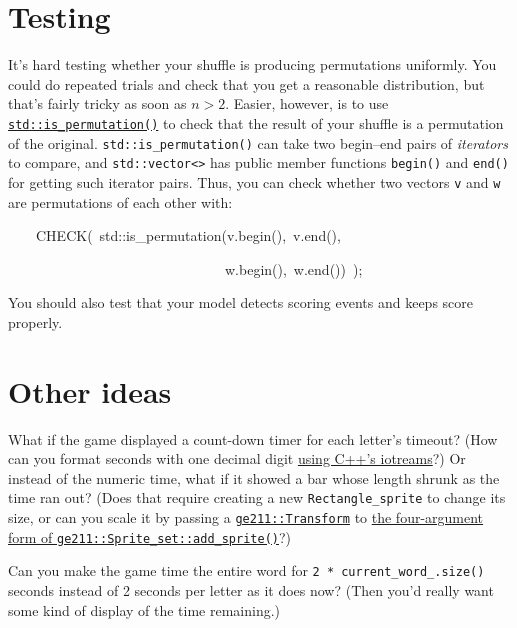 \documentclass{tufte-handout}
\begin{document}
\section{Testing}

It's hard testing whether your shuffle is producing permutations
uniformly. You could do repeated trials and check that you get a
reasonable distribution, but that's fairly tricky as soon as $n > 2$.
Easier, however, is to use
\href{https://en.cppreference.com/w/cpp/algorithm/is_permutation}
{\texttt{std::is_permutation()}} to check that the result of your shuffle
is a permutation of the original. \texttt{std::is_permutation()} can take
two begin--end pairs of \emph{iterators} to compare, and
\verb!std::vector<>! has public member functions \texttt{begin()} and
\texttt{end()} for getting such iterator pairs. Thus, you can check
whether two vectors \texttt{v} and \texttt{w} are permutations of each
other with:

\noindent
\bgroup\ttfamily
\strut~~~~CHECK(~std::is_permutation(v.begin(),~v.end(),
 \\ \noindent
\strut~~~~~~~~~~~~~~~~~~~~~~~~~~~~~~~w.begin(),~w.end())~);
\egroup\par\medskip

You should also test that your model detects scoring events and keeps
score properly.

\section{Other ideas}

What if the game displayed a count-down timer for each letter's timeout?
(How can you format seconds with one decimal digit
\href{https://en.cppreference.com/w/cpp/io/manip/setprecision}{using
C++'s iotreams}?) Or instead of the numeric time, what if it showed a
bar whose length shrunk as the time ran out? (Does that require creating
a new \texttt{Rectangle_sprite} to change its size, or can you scale it
by passing a
\href{https://tov.github.io/ge211/classge211_1_1geometry_1_1_transform.html}
{\texttt{ge211::Transform}} to
\href{https://bit.ly/2SDxmHC}
{the four-argument form of \texttt{ge211::Sprite_set::add_sprite()}}?)

Can you make the game time the entire word for
\texttt{2 * current_word_.size()} seconds
instead of 2 seconds per letter as it does
now? (Then you'd really want some kind of display of the time
remaining.)
\end{document}
